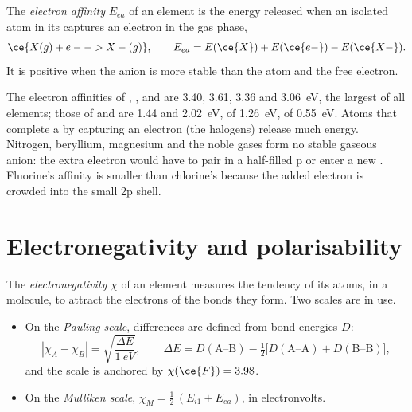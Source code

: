 \begin{definition}\label{def:b1:periodicity:electron-affinity}
The \emph{electron affinity} $E_{ea}$ of an
element is the energy released when an isolated atom in its 
captures an electron in the gas phase,
\[
  \ce{X(g) + e- -> X-(g)}, \qquad E_{ea} = E(\ce{X}) + E(\ce{e-}) - E(\ce{X-}) .
\]
It is positive when the anion is more stable than the atom and the free
electron.
\end{definition}

\begin{example}\label{ex:b1:periodicity:ea}
The electron affinities of , ,  and  are 3.40,
3.61, 3.36 and \qty{3.06}{eV}, the largest of all elements; those of
 and  are 1.44 and \qty{2.02}{eV}, of  \qty{1.26}{eV},
of  \qty{0.55}{eV}. Atoms that complete a  by capturing
an electron (the halogens) release much energy. Nitrogen, beryllium,
magnesium and the noble gases form no stable gaseous anion: the extra
electron would have to pair in a half-filled p  or enter a new
. Fluorine's affinity is smaller than chlorine's because the
added electron is crowded into the small 2p shell.
\end{example}

\section{Electronegativity and polarisability}

\begin{definition}[Electronegativity]\label{def:b1:periodicity:electronegativity}
The \emph{electronegativity} $\chi$ of an
element measures the tendency of its atoms, in a molecule, to attract
the electrons of the bonds they form. Two scales are in use.
\begin{itemize}
  \item On the \emph{Pauling scale}, differences
        are defined from bond energies $D$:
        \[
          |\chi_A - \chi_B| = \sqrt{\frac{\Delta E}{\qty{1}{eV}}}, \qquad
          \Delta E = D(\text{A--B}) - \tfrac12\big[D(\text{A--A}) +
          D(\text{B--B})\big],
        \]
        and the scale is anchored by $\chi(\ce{F}) = 3.98$.
  \item On the \emph{Mulliken scale},
        $\chi_M = \tfrac12\,(E_{i1} + E_{ea})$, in electronvolts.
\end{itemize}
\end{definition}

